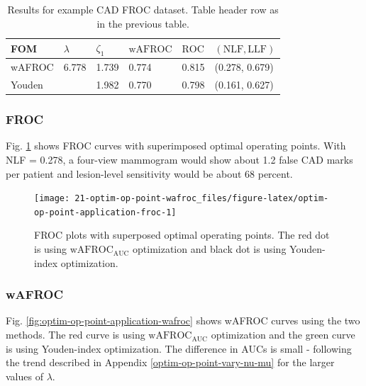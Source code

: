 \documentclass[
]{book}
\begin{document}
\begin{table}

\caption{\label{tab:optim-op-point-table4}Results for example CAD FROC dataset. Table header row as in the previous table.}
\centering
\fontsize{10}{12}\selectfont
\begin{tabular}[t]{llllll}
\toprule
FOM & $\lambda$ & $\zeta_1$ & $\text{wAFROC}$ & $\text{ROC}$ & $\left( \text{NLF}, \text{LLF}\right)$\\
\midrule
wAFROC & 6.778 & 1.739 & 0.774 & 0.815 & (0.278, 0.679)\\
Youden &  & 1.982 & 0.770 & 0.798 & (0.161, 0.627)\\
\bottomrule
\end{tabular}
\end{table}

\hypertarget{froc-2}{%
\subsubsection{FROC}\label{froc-2}}

Fig. \ref{fig:optim-op-point-application-froc} shows FROC curves with superimposed optimal operating points. With NLF = 0.278, a four-view mammogram would show about 1.2 false CAD marks per patient and lesion-level sensitivity would be about 68 percent.

\begin{figure}

{\centering \texttt{[image: 21-optim-op-point-wafroc\_files/figure-latex/optim-op-point-application-froc-1]} 

}

\caption{FROC plots with superposed optimal operating points. The red dot is using $\text{wAFROC}_\text{AUC}$ optimization and black dot is using Youden-index optimization.}\label{fig:optim-op-point-application-froc}
\end{figure}

\hypertarget{wafroc-2}{%
\subsubsection{wAFROC}\label{wafroc-2}}

Fig. \ref{fig:optim-op-point-application-wafroc} shows wAFROC curves using the two methods. The red curve is using \(\text{wAFROC}_\text{AUC}\) optimization and the green curve is using Youden-index optimization. The difference in AUCs is small - following the trend described in Appendix \ref{optim-op-point-vary-nu-mu} for the larger values of \(\lambda\).
\end{document}
